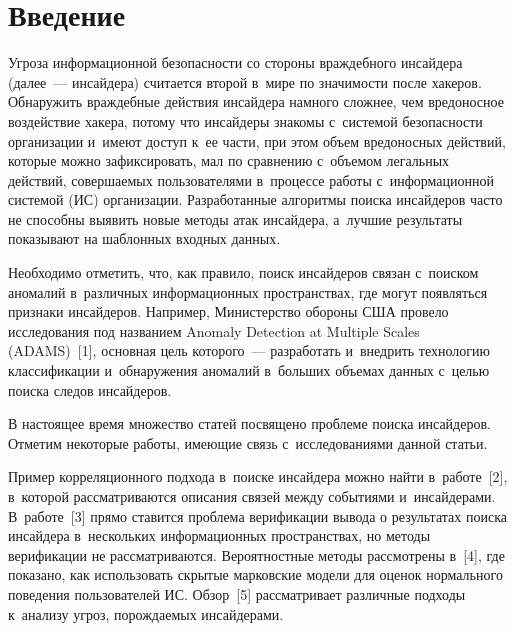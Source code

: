   
  
\vspace*{3pt}



\thispagestyle{headings}

\begin{multicols}{2}

\label{st\stat}

  

\section{Введение} 
  
  Угроза информационной безопас\-ности со стороны враждебного инсайдера 
(далее~--- инсайдера) считается второй в~мире по значимости после хакеров. 
Обнаружить враждебные действия инсайдера намного сложнее, чем 
вредоносное воздействие хакера, потому что инсайдеры знакомы с~системой 
безопас\-ности организации и~имеют доступ к~ее час\-ти, при этом объем 
вредоносных действий, которые можно зафиксировать, мал по сравнению 
с~объемом легальных действий, совершаемых пользователями в~процессе работы
 с~информационной системой (ИС) организации. Разработанные алгоритмы 
поиска инсайдеров часто не способны выявить новые методы атак инсайдера, 
а~лучшие результаты показывают на шаблонных входных данных.
  
  Необходимо отметить, что, как правило, поиск инсайдеров связан с~поиском 
аномалий в~различных информационных пространствах, где могут появляться 
признаки инсайдеров. Например, Министерство обороны США провело 
исследования под названием Anomaly Detection at Multiple Scales (ADAMS)~[1], 
основная цель которого~--- разработать и~внедрить технологию классификации 
и~обнаружения аномалий в~больших объемах данных с~целью поиска следов 
инсайдеров.
  
  В настоящее время множество статей посвящено проблеме поиска 
инсайдеров. Отметим некоторые работы, имеющие связь с~исследованиями 
данной статьи.
  
  Пример корреляционного подхода в~поиске инсайдера можно найти 
  в~работе~[2], в~которой рас\-смат\-ри\-ва\-ют\-ся описания связей между событиями 
  и~инсайдерами. В~работе~[3] прямо ставится проблема верификации вывода о 
результатах поиска инсайдера в~нескольких информационных пространствах, но 
методы верификации не рассматриваются. Вероятностные методы рассмотрены 
в~[4], где показано, как использовать скрытые марковские модели для оценок 
нормального поведения пользователей ИС. Обзор~[5] рассматривает различные 
подходы к~анализу угроз, порождаемых инсайдерами. 
  

\end{multicols}
